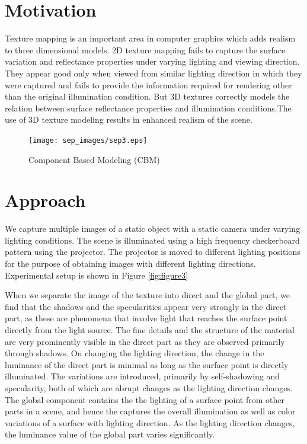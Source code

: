\section{Motivation}
Texture mapping is an important area in computer graphics which adds realism to three dimensional models.
2D texture mapping fails to capture the surface variation and reflectance properties under
varying lighting and viewing direction. They appear good only when viewed from similar lighting
direction in which they were captured and fails to provide the information required for rendering other than the original
illumination condition. But 3D textures correctly models the relation between surface reflectance
properties and illumination conditions.The use of 3D texture modeling
results in enhanced realism of the scene.

\begin{figure}[t]
\centering
\texttt{[image: sep\_images/sep3.eps]}
\label{fig:2}
\caption{Component Based Modeling (CBM)}
\end{figure}
\section{Approach}
We capture multiple images of a static object with a static camera under varying
lighting conditions.
The scene is
illuminated using a high frequency checkerboard pattern using the projector. The
projector is moved to different lighting positions for the purpose of obtaining
images with different lighting directions. Experimental setup is shown in Figure \ref{fig:figure3}

When we separate the image of the texture into direct and the global part, we find
that the shadows and the specularities appear very strongly in the direct part,
as these are phenomena that involve light that reaches the surface point
directly from the light source. The fine details and the structure of the
material are very prominently visible in the direct part as they are observed
primarily through shadows. On changing the lighting direction, the change in the
luminance of the direct part is minimal as long as the surface point is directly
illuminated. The variations are introduced, primarily by self-shadowing and
specularity, both of which are abrupt changes as the lighting direction changes.
The global component contains the the lighting of a surface point from other
parts in a scene, and hence the captures the overall illumination as well as
color variations of a surface with lighting direction. As the lighting direction
changes, the luminance value of the global part varies significantly.

